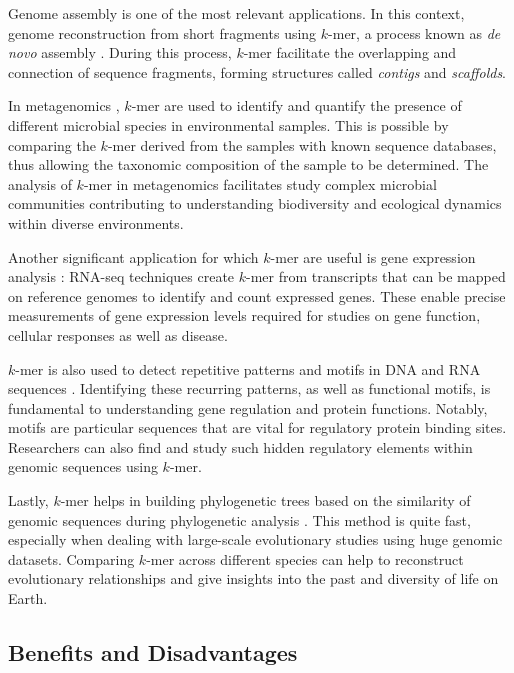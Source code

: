 	Genome assembly is one of the most relevant applications. In this context, genome reconstruction from short fragments using $k$-mer, a process known as \emph{de novo} assembly \cite{nagarajan2013sequence}. During this process, $k$-mer facilitate the overlapping and connection of sequence fragments, forming structures called \emph{contigs} and \emph{scaffolds}.
	
	In metagenomics \cite{wood2014kraken}, $k$-mer are used to identify and quantify the presence of different microbial species in environmental samples. This is possible by comparing the $k$-mer derived from the samples with known sequence databases, thus allowing the taxonomic composition of the sample to be determined. The analysis of $k$-mer in metagenomics facilitates study complex microbial communities contributing to understanding biodiversity and ecological dynamics within diverse environments.
	
	Another significant application for which $k$-mer are useful is gene expression analysis \cite{conesa2016survey}: \acs{RNA}-seq techniques create $k$-mer from transcripts that can be mapped on reference genomes to identify and count expressed genes. These enable precise measurements of gene expression levels required for studies on gene function, cellular responses as well as disease.
	
	$k$-mer is also used to detect repetitive patterns and motifs in \acs{DNA} and \acs{RNA} sequences \cite{frazer2004vista}. Identifying these recurring patterns, as well as functional motifs, is fundamental to understanding gene regulation and protein functions. Notably, motifs are particular sequences that are vital for regulatory protein binding sites. Researchers can also find and study such hidden regulatory elements within genomic sequences using $k$-mer.
	
	Lastly, $k$-mer helps in building phylogenetic trees based on the similarity of genomic sequences during phylogenetic analysis \cite{ondov2016mash}. This method is quite fast, especially when dealing with large-scale evolutionary studies using huge genomic datasets. Comparing $k$-mer across different species can help to reconstruct evolutionary relationships and give insights into the past and diversity of life on Earth.




	\subsection{Benefits and Disadvantages}
	\label{subsec:kmer-benefit-and-disadvantages}
	
